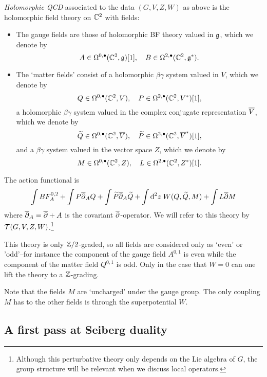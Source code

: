 \documentclass[11pt]{amsart}
\begin{document}
\begin{dfn}
{\em Holomorphic QCD} associated to the data $(G,V,Z,W)$ as above is the holomorphic field theory on $\CC^2$ with fields:
\begin{itemize}
\item The gauge fields are those of holomorphic BF theory valued in $\fg$, which we denote by
\[
A \in \Omega^{0,\bu}(\CC^2 , \fg)[1] , \quad B \in \Omega^{2,\bu}(\CC^2, \fg^*) .
\]
\item The `matter fields' consist of a holomorphic $\beta\gamma$ system valued in $V$, which we denote by
\[
Q \in \Omega^{0,\bu}(\CC^2 , V) , \quad P \in \Omega^{2,\bu}(\CC^2 , V^*)[1] ,
\]
a holomorphic $\beta\gamma$ system valued in the complex conjugate representation $\Bar{V}$, which we denote by
\[
\Tilde{Q} \in \Omega^{0,\bu}(\CC^2 , \Bar{V}) , \quad \Tilde{P} \in \Omega^{2,\bu}(\CC^2 , \Bar{V}^*) [1],
\]
and a $\beta\gamma$ system valued in the vector space $Z$, which we denote by
\[
M \in \Omega^{0,\bu}(\CC^2 , Z) , \quad L \in \Omega^{2,\bu}(\CC^2 , Z^*) [1] .
\]
\end{itemize}

The action functional is
\[
\int B F^{0,2}_A + \int P \dbar_A Q + \int \Tilde{P} \dbar_A \Tilde{Q} + \int \d^2 z \; W(Q, \Tilde{Q}, M) + \int L \dbar M
\]
where $\dbar_A = \dbar + A$ is the covariant $\dbar$-operator. 
We will refer to this theory by $\cT(G,V,Z,W)$.\footnote{Although this perturbative theory only depends on the Lie algebra of $G$, the group structure will be relevant when we discuss local operators.} 
\end{dfn}


\begin{rmk}
This theory is only $\ZZ/2$-graded, so all fields are considered only as `even' or 'odd'--for instance the component of the gauge field $A^{0,1}$ is even while the component of the matter field $Q^{0,1}$ is odd. 
Only in the case that $W = 0$ can one lift the theory to a $\ZZ$-grading.
\end{rmk}

\begin{rmk}
Note that the fields $M$ are `uncharged' under the gauge group.
The only coupling $M$ has to the other fields is through the superpotential $W$. 
\end{rmk}

\subsection{A first pass at Seiberg duality}
\end{document}
